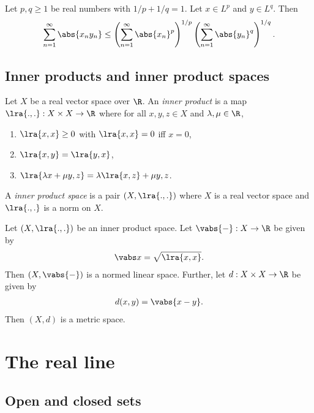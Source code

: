 \documentclass{article}
\begin{document}
\begin{lemma}
    Let $p,q\geq 1$ be real numbers with $1/p+1/q=1$. Let $x\in L^p$ and $y\in L^q$. Then
    \begin{align*}
        \sum_{n=1}^\infty \abs{x_ny_n}\leq
        \left(\sum_{n=1}^\infty\abs{x_n}^p\right)^{1/p}
        \left(\sum_{n=1}^\infty\abs{y_n}^q\right)^{1/q}.
    \end{align*}
\end{lemma}

\subsection{Inner products and inner product spaces}

\begin{definition}
    Let $X$ be a real vector space over $\R$. An \emph{inner product}
    is a map $\lra{.,.}:X\times X\to\R$ where for all $x,y,z\in X$ and
    $\lambda,\mu\in\R$,
    \begin{enumerate}
        \item $\lra{x,x}\geq 0$ with $\lra{x,x}=0$ iff $x=0$,
        \item $\lra{x,y}=\lra{y,x}$,
        \item $\lra{\lambda x+\mu y,z}=\lambda\lra{x,z}+\mu{y,z}$.
    \end{enumerate}
    A \emph{inner product space} is a pair $(X, \lra{.,.})$ where $X$ is a real
    vector space and $\lra{.,.}$ is a norm on $X$.
\end{definition}

\begin{lemma}
    Let $(X,\lra{.,.})$ be an inner product space. Let $\vabs{-}:X\to\R$ be given
    by
    \begin{align*}
        \vabs x = \sqrt{\lra{x,x}}.
    \end{align*}
    Then $(X,\vabs{-})$ is a normed linear space. Further, let $d:X\times X\to\R$
    be given by
    \begin{align*}
        d(x,y)=\vabs{x-y}.
    \end{align*}
    Then $(X,d)$ is a metric space.
\end{lemma}

\section{The real line}

\subsection{Open and closed sets}
\end{document}
